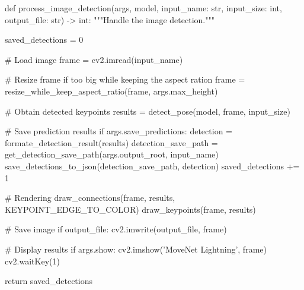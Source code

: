 \startPY
def process_image_detection(args, model, input_name: str, input_size: int, output_file: str) -> int:
        """Handle the image detection."""

        saved_detections = 0

        # Load image
        frame = cv2.imread(input_name)

        # Resize frame if too big while keeping the aspect ration
        frame = resize_while_keep_aspect_ratio(frame, args.max_height)

        # Obtain detected keypoints
        results = detect_pose(model, frame, input_size)

        # Save prediction results
        if args.save_predictions:
                detection = formate_detection_result(results)
                detection_save_path = get_detection_save_path(args.output_root, input_name)
                save_detections_to_json(detection_save_path, detection)
                saved_detections += 1

        # Rendering
        draw_connections(frame, results, KEYPOINT_EDGE_TO_COLOR)
        draw_keypoints(frame, results)

        # Save image
        if output_file:
                cv2.imwrite(output_file, frame)

        # Display results
        if args.show:
            cv2.imshow('MoveNet Lightning', frame)
            cv2.waitKey(1)

        return saved_detections
\stopPY
\stopbuffer